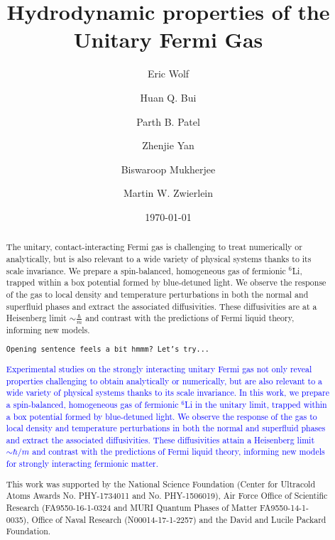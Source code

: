 \documentclass[preprint,aps]{revtex4}
\begin{document}


\title{Hydrodynamic properties of the Unitary Fermi Gas}


\author{Eric Wolf}%
%
\author{Huan Q. Bui}%
%
\author{Parth B. Patel}
\author{Zhenjie Yan}
\author{Biswaroop Mukherjee}
\author{Martin W. Zwierlein}


%

\date{\today}%

\begin{abstract}
The unitary, contact-interacting Fermi gas is challenging to treat numerically or analytically, but is also relevant to a wide variety of physical systems thanks to its scale invariance. We prepare a spin-balanced, homogeneous gas of fermionic $^6$Li, trapped within a box potential formed by blue-detuned light. We observe the response of the gas to local density and temperature perturbations in both the normal and superfluid phases and extract the associated diffusivities. These diffusivities are at a Heisenberg limit $\sim \frac{\hbar}{m}$ and contrast with the predictions of Fermi liquid theory, informing new models.

\texttt{Opening sentence feels a bit hmmm? Let's try...}

\textcolor{blue}{Experimental studies on the strongly interacting unitary Fermi gas not only reveal properties challenging to obtain analytically or numerically, but are also relevant to a wide variety of physical systems thanks to its scale invariance. In this work, we prepare a spin-balanced, homogeneous gas of fermionic $^6$Li in the unitary limit, trapped within a box potential formed by blue-detuned light. We observe the response of the gas to local density and temperature perturbations in both the normal and superfluid phases and extract the associated diffusivities. These diffusivities attain a Heisenberg limit $\sim \hbar/m$ and contrast with the predictions of Fermi liquid theory, informing new models for strongly interacting fermionic matter.   }

This work was supported by the National Science Foundation (Center for Ultracold Atoms Awards No. PHY-1734011 and No. PHY-1506019), Air Force Office of Scientific Research (FA9550-16-1-0324 and MURI Quantum Phases of Matter FA9550-14-1-0035), Office of Naval Research (N00014-17-1-2257) and the David and Lucile Packard Foundation.

\end{abstract}


\maketitle
\end{document}
